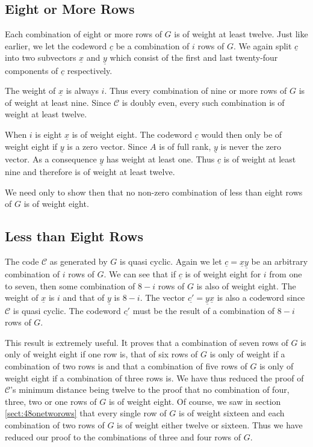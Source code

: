 \subsection{Eight or More Rows}
Each combination of eight or more rows of $G$ is of weight at least twelve.
Just like earlier, we let the codeword $\underline{c}$ be a combination of $i$ rows of $G$.
We again split $\underline{c}$ into two subvectors $\underline{x}$ and $\underline{y}$ which consist of the first and last twenty-four components of $\underline{c}$ respectively.

The weight of $\underline{x}$ is always $i$.
Thus every combination of nine or more rows of $G$ is of weight at least nine.
Since $\mathcal{C}$ is doubly even, every such combination is of weight at least twelve.

When $i$ is eight $\underline{x}$ is of weight eight.
The codeword $\underline{c}$ would then only be of weight eight if $\underline{y}$ is a zero vector.
Since $A$ is of full rank, $\underline{y}$ is never the zero vector.
As a consequence $\underline{y}$ has weight at least one.
Thus $\underline{c}$ is of weight at least nine and therefore is of weight at least twelve.

We need only to show then that no non-zero combination of less than eight rows of $G$ is of weight eight.

\subsection{Less than Eight Rows}
The code $\mathcal{C}$ as generated by $G$ is quasi cyclic.
Again we let $\underline{c} = \underline{x} \underline{y}$ be an arbitrary combination of $i$ rows of $G$.
We can see that if $\underline{c}$ is of weight eight for $i$ from one to seven, then some combination of $8-i$ rows of $G$ is also of weight eight.
The weight of $\underline{x}$ is $i$ and that of $\underline{y}$ is $8-i$.
The vector $\underline{c'} = \underline{y} \underline{x}$ is also a codeword since $\mathcal{C}$ is quasi cyclic.
The codeword $\underline{c'}$ must be the result of a combination of $8-i$ rows of $G$.

This result is extremely useful.
It proves that a combination of seven rows of $G$ is only of weight eight if one row is, that of six rows of $G$ is only of weight if a combination of two rows is and that a combination of five rows of $G$ is only of weight eight if a combination of three rows is.
We have thus reduced the proof of $\mathcal{C}$'s minimum distance being twelve to the proof that no combination of four, three, two or one rows of $G$ is of weight eight.
Of course, we saw in section \ref{sect:48onetworows} that every single row of $G$ is of weight sixteen and each combination of two rows of $G$ is of weight either twelve or sixteen.
Thus we have reduced our proof to the combinations of three and four rows of $G$.

